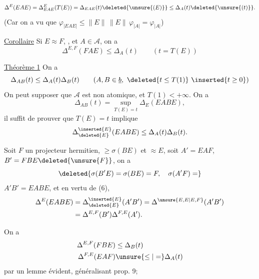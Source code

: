 \[
\Delta^E(EAE)=\Delta_{EAE}^E(T(E))
=\Delta_{EAE}(t)\deleted{\unsure{(E)}}\leq\Delta_A(t)\deleted{\unsure{(t)}}.
\]
(Car on a vu que $\varphi_{|EAE|}\leq\|E\|\,\|E\|\,\varphi_{|A|}=\varphi_{|A|}$)

\uline{Corollaire} Si $E\approx F$, , et $A\in\mathcal A$, on a
\[
\Delta^{E,F}(FAE)\leq\Delta_A(t)\qquad(t=T(E))
\]

\uline{Théorème 1} On a
\[
\Delta_{AB}(t)\leq\Delta_A(t)\Delta_B(t)
\qquad(A,B\in\underline b,\ \deleted{t\leq T(1)}\ \inserted{t\geq0})
\]
On peut supposer que $\mathcal A$ est non atomique, et $T(1)<+\infty$. On a
\[
\Delta_{AB}(t)=\sup_{T(E)=t}\Delta_E(EABE),
\]
il suffit de prouver que $T(E)=t$ implique
\[
\Delta_{\deleted{E}}^{\inserted{E}}(EABE)\leq\Delta_A(t)\Delta_B(t).
\]

Soit $F$ un projecteur hermitien, $\geq\sigma(BE)$ et $\approx E$, soit $A'=EAF$, $B'=FBE\deleted{\unsure{F}}$, on a
\[
\deleted{\sigma(B'E)=\sigma(BE)=F,\quad\sigma(A'F)=}
\]
$A'B'=EABE$, et en vertu de (6),
\[
\begin{aligned}
\Delta^E(EABE)&=\Delta_{\deleted{E}}^{\inserted{E}}(A'B')
=\Delta^{\unsure{E,E|E,F}}(A'B')\\
&=\Delta^{E,F}(B')\Delta^{F,E}(A').
\end{aligned}
\]



On a 
\[
\begin{aligned}
\Delta^{E,F}(FBE)&\leq\Delta_B(t)\\
\Delta^{F,E}(EAF)&\unsure{\leq|=}\Delta_A(t)
\end{aligned}
\]
par un lemme évident, généralisant prop. 9;
